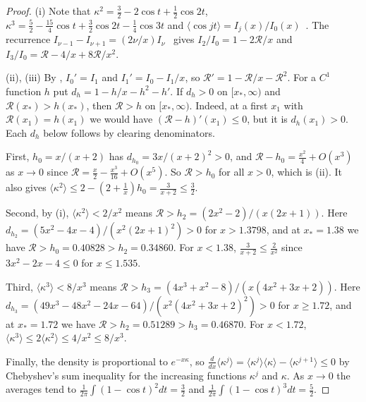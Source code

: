 \begin{proof}
(i) Note that $\kappa^2=\frac32-2\cos t+\frac12\cos2t$,
$\kappa^3=\frac52-\frac{15}4\cos t+\frac32\cos2t-\frac14\cos3t$ and
$\langle\cos jt\rangle=I_j(x)/I_0(x)$~\cite[Eq.~10.32.3]{dlmf}. The recurrence
$I_{\nu-1}-I_{\nu+1}=(2\nu/x)I_\nu$~\cite[Eq.~10.29.1]{dlmf} gives $I_2/I_0=1-2\mathcal R/x$ and
$I_3/I_0=\mathcal R-4/x+8\mathcal R/x^2$.

(ii), (iii) By \cite[Eqs.~10.29.2, 10.29.3]{dlmf}, $I_0'=I_1$ and $I_1'=I_0-I_1/x$, so
$\mathcal R'=1-\mathcal R/x-\mathcal R^2$. For a $C^1$ function $h$ put $d_h=1-h/x-h^2-h'$. If
$d_h>0$ on $[x_*,\infty)$ and $\mathcal R(x_*)>h(x_*)$, then $\mathcal R>h$ on $[x_*,\infty)$.
Indeed, at a first $x_1$ with $\mathcal R(x_1)=h(x_1)$ we would have
$(\mathcal R-h)'(x_1)\le0$, but it is $d_h(x_1)>0$. Each $d_h$ below follows by clearing
denominators.

First, $h_0=x/(x+2)$ has $d_{h_0}=3x/(x+2)^2>0$, and $\mathcal R-h_0=\frac{x^2}4+O(x^3)$ as $x\to0$
since $\mathcal R=\frac x2-\frac{x^3}{16}+O(x^5)$. So $\mathcal R>h_0$ for all $x>0$, which is
(ii). It also gives $\langle\kappa^2\rangle\le2-(2+\frac1x)h_0=\frac3{x+2}\le\frac32$.

Second, by (i), $\langle\kappa^2\rangle<2/x^2$ means $\mathcal R>h_2=(2x^2-2)/(x(2x+1))$. Here
$d_{h_2}=(5x^2-4x-4)/(x^2(2x+1)^2)>0$ for $x>1.3798$, and at $x_*=1.38$ we have
$\mathcal R>h_0=0.40828>h_2=0.34860$. For $x<1.38$, $\frac3{x+2}\le\frac2{x^2}$ since
$3x^2-2x-4\le0$ for $x\le1.535$.

Third, $\langle\kappa^3\rangle<8/x^3$ means $\mathcal R>h_3=(4x^3+x^2-8)/(x(4x^2+3x+2))$. Here
$d_{h_3}=(49x^3-48x^2-24x-64)/(x^2(4x^2+3x+2)^2)>0$ for $x\ge1.72$, and at $x_*=1.72$ we have
$\mathcal R>h_2=0.51289>h_3=0.46870$. For $x<1.72$,
$\langle\kappa^3\rangle\le2\langle\kappa^2\rangle\le4/x^2\le8/x^3$.

Finally, the density is proportional to $e^{-x\kappa}$, so
$\frac d{dx}\langle\kappa^j\rangle
=\langle\kappa^j\rangle\langle\kappa\rangle-\langle\kappa^{j+1}\rangle\le0$ by Chebyshev's sum
inequality for the increasing functions $\kappa^j$ and $\kappa$. As $x\to0$ the averages tend to
$\frac1{2\pi}\int(1-\cos t)^2dt=\frac32$ and $\frac1{2\pi}\int(1-\cos t)^3dt=\frac52$.
\end{proof}

